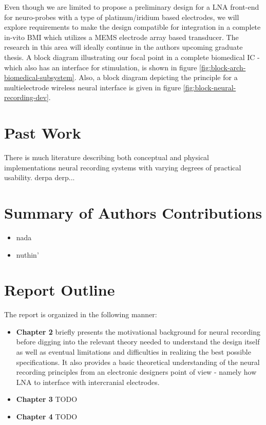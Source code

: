     Even though we are limited to propose a preliminary design for a \acl{LNA} front-end for neuro-probes with a type of platinum/iridium based electrodes, we will explore requirements to make the design compatible for integration in a complete in-vito \acl{BMI} which utilizes a \acs{MEMS} electrode array based transducer. The research in this area will ideally continue in the authors upcoming graduate thesis. A block diagram illustrating our focal point in a complete biomedical \acs{IC} - which also has an interface for stimulation, is shown in figure \ref{fig:block-arch-biomedical-subsystem}. Also, a block diagram depicting the principle for a multielectrode wireless neural interface is given in figure \ref{fig:block-neural-recording-dev}.
  
\section{Past Work}
There is much literature describing both conceptual and physical implementations neural recording systems with varying degrees of practical usability. derpa derp...%

\section{Summary of Authors Contributions}
  \begin{itemize} 
    \item nada
    \item nuthin'
  \end{itemize}

\section{Report Outline}
The report is organized in the following manner:
  \begin{itemize}
    \item \textbf{Chapter 2} briefly presents the motivational background for neural recording before digging into the relevant theory needed to understand the design 
		  itself as well as eventual limitations and difficulties in realizing the best possible specifications. 
		  It also provides a basic theoretical understanding of the neural recording principles from an electronic designers point of view - namely how \acs{LNA} to interface
		  with intercranial electrodes.
    \item \textbf{Chapter 3} TODO
    \item \textbf{Chapter 4} TODO
  \end{itemize}
 